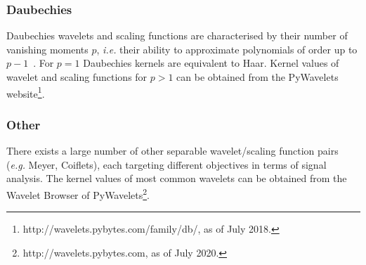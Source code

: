 \documentclass[fleqn,a4paper,oneside,openany]{book}
\begin{document}
\subsubsection{Daubechies}\label{sec:daubechies}
%
Daubechies wavelets and scaling functions are characterised by their number of vanishing moments $p$, \textit{i.e.} their ability to approximate polynomials of order up to $p-1$~\cite{Dau1992}.
For $p=1$ Daubechies kernels are equivalent to Haar.
Kernel values of wavelet and scaling functions for $p>1$ can be obtained from the PyWavelets website\footnote{http://wavelets.pybytes.com/family/db/, as of July 2018.}.
%
\subsubsection{Other}\label{sec:otherWavelets}
%
There exists a large number of other separable wavelet/scaling function pairs (\textit{e.g.} Meyer, Coiflets), each targeting different objectives in terms of signal analysis. The kernel values of most common wavelets can be obtained from the Wavelet Browser of PyWavelets\footnote{http://wavelets.pybytes.com, as of July 2020.}.
%
%
\vspace{2mm}
\end{document}
